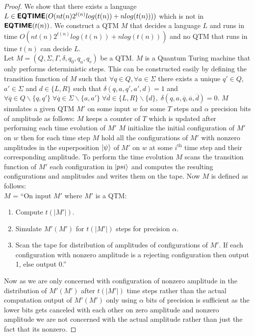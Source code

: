 \documentclass[11pt,a4paper]{article}
\newcommand{\classX}[1]{\ensuremath{\text{\textsf{\textbf{#1}}}}}
\newcommand{\EQ}{\classX{EQTIME}}
\begin{document}
    \begin{proof}
        We show that there exists a language $L \in \EQ(O(nt(n)2^{t(n)}log(t(n))+nlog(t(n))))$ which is not in $\EQ(t(n))$.
        We construct a QTM $M$ that decides a language $L$ and runs in time $O(nt(n)2^{t(n)}log(t(n))+nlog(t(n)))$ and no QTM that runs in time $t(n)$ can decide $L$.
        \\Let $M = (Q, \Sigma, \Gamma, \delta, q_0, q_a, q_r)$ be a QTM. $M$ is a Quantum Turing machine that only performs deterministic steps. This can be constructed easily by defining the transition function of $M$ such that 
        $\forall q \in Q, \forall a \in \Sigma$ there exists a unique $q' \in Q$, $a'\in \Sigma$ and $d \in \{L,R\}$ such that $\delta(q,a,q',a',d) = 1$ and 
        $\forall \overline{q} \in Q\backslash \{q,q'\}\; \forall \overline{q} \in \Sigma\backslash \{a,a'\}\; \forall \overline{d} \in \{L,R\}\backslash \{d\},\;\delta(q,a,\overline{q},\overline{a}, \overline{d}) = 0$.
        $M$ simulates a given QTM $M'$ on some input $w$ for some $T$ steps and $\alpha$ precision bits of amplitude as follows: $M$ keeps a counter of $T$ which is updated after performing each time evolution of $M'$
        $M$ initialize the initial configuration of $M'$ on $w$ then for each time step $M$ hold all the configurations of $M'$ with nonzero amplitudes in the superposition $\ket{\psi}$ of $M'$ on $w$ at some $i^{\text{th}}$ time step and their corresponding amplitude.
        To perform the time evolution $M$ scans the transition function of $M'$ each configuration in $\ket{psi}$ and computes the resulting configurations and amplitudes and writes them on the tape. Now $M$ is defined as follows:
        \\$M$ = ``On input $M'$ where $M'$ is a QTM:
        \begin{enumerate}
            \item Compute $t(|M'|)$.
            \item Simulate $M'(M')$ for $t(|M'|)$ steps for precision $\alpha$.
            \item Scan the tape for distribution of amplitudes of configurations of $M'$. 
            If each configuration with nonzero amplitude is a rejecting configuration then output 1, else output 0.'' 
        \end{enumerate}
        Now as we are only concerned with configuration of nonzero amplitude in the distribution of $M'(M')$ after $t(|M'|)$ time steps rather than the actual computation output of $M'(M')$ only using $\alpha$ bits of precision is sufficient as the lower bits gets canceled with each other on zero amplitude and nonzero amplitude we are not concerned with the actual amplitude rather than just the fact that its nonzero.

\end{proof}
\end{document}
